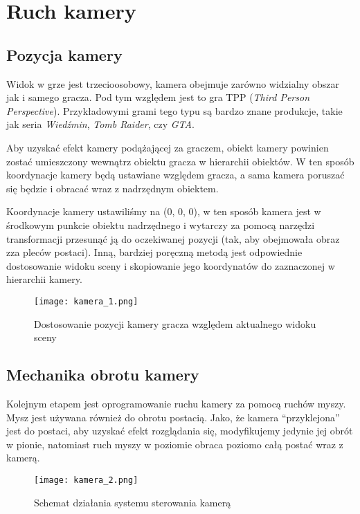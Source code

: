 \section{Ruch kamery}

\subsection{Pozycja kamery}

    Widok w grze jest trzecioosobowy, kamera obejmuje zarówno widzialny obszar jak i samego gracza. Pod tym względem jest to gra TPP (\textit{Third Person Perspective}). Przykładowymi grami tego typu są bardzo znane produkcje, takie jak seria \textit{Wiedźmin}, \textit{Tomb Raider}, czy \textit{GTA}.

    Aby uzyskać efekt kamery podążającej za graczem, obiekt kamery powinien zostać umieszczony wewnątrz obiektu gracza w hierarchii obiektów. W ten sposób koordynacje kamery będą ustawiane względem gracza, a sama kamera poruszać się będzie i obracać wraz z nadrzędnym obiektem.

    Koordynacje kamery ustawiliśmy na (0, 0, 0), w ten sposób kamera jest w środkowym punkcie obiektu nadrzędnego i wytarczy za pomocą narzędzi transformacji przesunąć ją do oczekiwanej pozycji (tak, aby obejmowała obraz zza pleców postaci). Inną, bardziej poręczną metodą jest odpowiednie dostosowanie widoku sceny i skopiowanie jego koordynatów do zaznaczonej w hierarchii kamery.

    \begin{figure}[H]
    \center
    \texttt{[image: kamera\_1.png]}
    \caption{Dostosowanie pozycji kamery gracza względem aktualnego widoku sceny}
    \end{figure}

\subsection{Mechanika obrotu kamery}

Kolejnym etapem jest oprogramowanie ruchu kamery za pomocą ruchów myszy. Mysz jest używana również do obrotu postacią. Jako, że kamera \enquote{przyklejona} jest do postaci, aby uzyskać efekt rozglądania się, modyfikujemy jedynie jej obrót w pionie, natomiast ruch myszy w poziomie obraca poziomo całą postać wraz z kamerą.

\begin{figure}[H]
\center
\texttt{[image: kamera\_2.png]}
\caption{Schemat działania systemu sterowania kamerą}
\end{figure}

